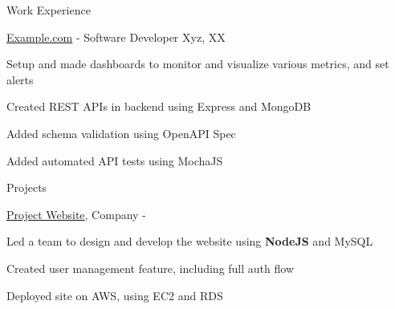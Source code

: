 \documentclass[UKenglish]{resume} %
\begin{document}
\begin{rSection}{Work Experience}

    \begin{rSubsection}
        {\href{https://example.com}{Example.com}}
        {  -  }
        {Software Developer}
        {Xyz, XX}

        \item Setup and made dashboards to monitor and visualize various metrics, and set alerts
        \item Created REST APIs in backend using Express and MongoDB
        \item Added schema validation using OpenAPI Spec
        \item Added automated API tests using MochaJS

    \end{rSubsection}

\end{rSection}


\begin{rSection}{Projects}

    \begin{rSubsection}
        {\href{https://example.com/project}{Project Website}, {\nem Company}}
        {  -  }
        {}{}
        \item Led a team to design and develop the website using \textbf{NodeJS} and MySQL
        \item Created user management feature, including full auth flow
        \item Deployed site on AWS, using EC2 and RDS
    \end{rSubsection}



\end{rSection}
\end{document}
